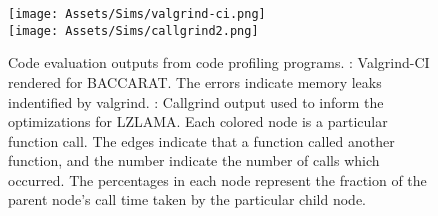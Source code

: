 \begin{figure}
    \centering
    \texttt{[image: Assets/Sims/valgrind-ci.png]}\\
    \texttt{[image: Assets/Sims/callgrind2.png]}
    \caption[Code evaluation outputs from code profiling programs.]%
    {Code evaluation outputs from code profiling programs. : Valgrind-CI rendered for BACCARAT.
    The errors indicate memory leaks indentified by valgrind.
    : Callgrind output used to inform the optimizations for LZLAMA.
    Each colored node is a particular function call.
    The edges indicate that a function called another function, and the number indicate the number of calls which occurred. 
    The percentages in each node represent the fraction of the parent node's call time taken by the particular child node. }
    \label{fig:profiling}
\end{figure}



